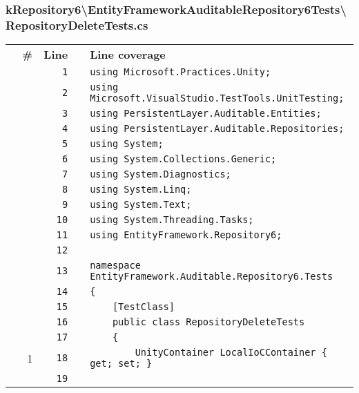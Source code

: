 \documentclass[a4paper,10pt]{article}
\begin{document}
\subsubsection{kRepository6\textbackslash EntityFrameworkAuditableRepository6Tests\textbackslash RepositoryDeleteTests.cs}
\begin{longtable}[l]{lrrll}
\textbf{} & \textbf{\#} & \textbf{Line} & \textbf{} & \textbf{Line coverage}\\
\cellcolor{gray} &  & \verb~1~ & & \verb~using Microsoft.Practices.Unity;~\\
\cellcolor{gray} &  & \verb~2~ & & \verb~using Microsoft.VisualStudio.TestTools.UnitTesting;~\\
\cellcolor{gray} &  & \verb~3~ & & \verb~using PersistentLayer.Auditable.Entities;~\\
\cellcolor{gray} &  & \verb~4~ & & \verb~using PersistentLayer.Auditable.Repositories;~\\
\cellcolor{gray} &  & \verb~5~ & & \verb~using System;~\\
\cellcolor{gray} &  & \verb~6~ & & \verb~using System.Collections.Generic;~\\
\cellcolor{gray} &  & \verb~7~ & & \verb~using System.Diagnostics;~\\
\cellcolor{gray} &  & \verb~8~ & & \verb~using System.Linq;~\\
\cellcolor{gray} &  & \verb~9~ & & \verb~using System.Text;~\\
\cellcolor{gray} &  & \verb~10~ & & \verb~using System.Threading.Tasks;~\\
\cellcolor{gray} &  & \verb~11~ & & \verb~using EntityFramework.Repository6;~\\
\cellcolor{gray} &  & \verb~12~ & & \verb~~\\
\cellcolor{gray} &  & \verb~13~ & & \verb~namespace EntityFramework.Auditable.Repository6.Tests~\\
\cellcolor{gray} &  & \verb~14~ & & \verb~{~\\
\cellcolor{gray} &  & \verb~15~ & & \verb~    [TestClass]~\\
\cellcolor{gray} &  & \verb~16~ & & \verb~    public class RepositoryDeleteTests~\\
\cellcolor{gray} &  & \verb~17~ & & \verb~    {~\\
\cellcolor{green} & 1 & \verb~18~ & & \verb~        UnityContainer LocalIoCContainer { get; set; }~\\
\cellcolor{gray} &  & \verb~19~ & & \verb~~\\

\end{longtable}
\end{document}
